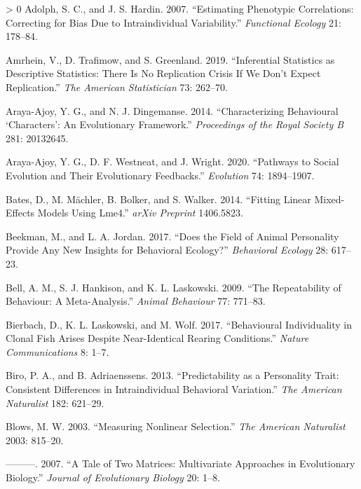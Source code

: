 \documentclass{article}
\newlength{\cslhangindent}
\newenvironment{CSLReferences}[3] %
 {%
  \setlength{\parindent}{0pt}
  \ifodd #1 \everypar{\setlength{\hangindent}{\cslhangindent}}\ignorespaces\fi
  \ifnum #2 > 0
  \setlength{\parskip}{#2\baselineskip}
  \fi
 }%
 {}
\begin{document}
\hypertarget{refs}{}
\begin{CSLReferences}{1}{0}
\leavevmode\hypertarget{ref-Adolf2007}{}%
Adolph, S. C., and J. S. Hardin. 2007. {``Estimating Phenotypic
Correlations: Correcting for Bias Due to Intraindividual Variability.''}
\emph{Functional Ecology} 21: 178--84.

\leavevmode\hypertarget{ref-Amrhein2019}{}%
Amrhein, V., D. Trafimow, and S. Greenland. 2019. {``Inferential
Statistics as Descriptive Statistics: There Is No Replication Crisis If
We Don't Expect Replication.''} \emph{The American Statistician} 73:
262--70.

\leavevmode\hypertarget{ref-Araya2014}{}%
Araya-Ajoy, Y. G., and N. J. Dingemanse. 2014. {``Characterizing
Behavioural {`Characters'}: An Evolutionary Framework.''}
\emph{Proceedings of the Royal Society B} 281: 20132645.

\leavevmode\hypertarget{ref-Araya2020}{}%
Araya-Ajoy, Y. G., D. F. Westneat, and J. Wright. 2020. {``Pathways to
Social Evolution and Their Evolutionary Feedbacks.''} \emph{Evolution}
74: 1894--1907.

\leavevmode\hypertarget{ref-Bates2014}{}%
Bates, D., M. Mächler, B. Bolker, and S. Walker. 2014. {``Fitting Linear
Mixed-Effects Models Using Lme4.''} \emph{arXiv Preprint} 1406.5823.

\leavevmode\hypertarget{ref-Beekman2017}{}%
Beekman, M., and L. A. Jordan. 2017. {``Does the Field of Animal
Personality Provide Any New Insights for Behavioral Ecology?''}
\emph{Behavioral Ecology} 28: 617--23.

\leavevmode\hypertarget{ref-Bell2009}{}%
Bell, A. M., S. J. Hankison, and K. L. Laskowski. 2009. {``The
Repeatability of Behaviour: A Meta-Analysis.''} \emph{Animal Behaviour}
77: 771--83.

\leavevmode\hypertarget{ref-Bierbach2017}{}%
Bierbach, D., K. L. Laskowski, and M. Wolf. 2017. {``Behavioural
Individuality in Clonal Fish Arises Despite Near-Identical Rearing
Conditions.''} \emph{Nature Communications} 8: 1--7.

\leavevmode\hypertarget{ref-Biro2013}{}%
Biro, P. A., and B. Adriaenssens. 2013. {``Predictability as a
Personality Trait: Consistent Differences in Intraindividual Behavioral
Variation.''} \emph{The American Naturalist} 182: 621--29.

\leavevmode\hypertarget{ref-Blows2003}{}%
Blows, M. W. 2003. {``Measuring Nonlinear Selection.''} \emph{The
American Naturalist} 2003: 815--20.

\leavevmode\hypertarget{ref-Blows2007}{}%
---------. 2007. {``A Tale of Two Matrices: Multivariate Approaches in
Evolutionary Biology.''} \emph{Journal of Evolutionary Biology} 20:
1--8.


\end{CSLReferences}
\end{document}
